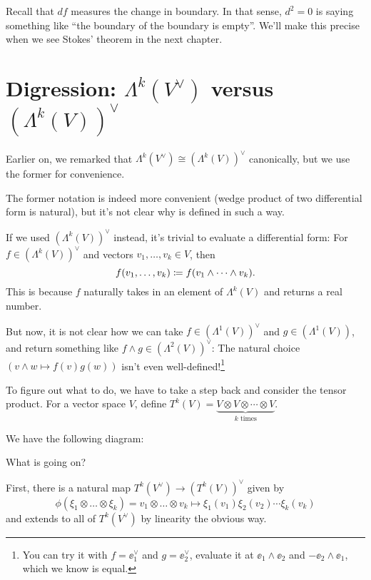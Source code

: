 Recall that $df$ measures the change in boundary.
In that sense, $d^2 = 0$ is saying something like
``the boundary of the boundary is empty''.
We'll make this precise when we see Stokes' theorem in the next chapter.

\section{Digression: $\Lambda^k(V^\vee)$ versus $(\Lambda^k(V))^\vee$}
\label{sec:wedge_product_dual}

Earlier on, we remarked that $\Lambda^k(V^\vee) \cong (\Lambda^k(V))^\vee$ canonically, but we
use the former for convenience.

The former notation is indeed more convenient (wedge product of
two differential form is natural), but it's not clear why  is
defined in such a way.

If we used $(\Lambda^k(V))^\vee$ instead, it's trivial to evaluate a differential form:
For $f \in (\Lambda^k(V))^\vee$ and vectors $v_1, \dots, v_k \in V$, then
\[
	f(v_1, \dots, v_k) \coloneqq f(v_1 \wedge \dots \wedge v_k).
\]
This is because $f$ naturally takes in an element of $\Lambda^k(V)$ and returns a real number.

But now, it is not clear how we can take $f \in (\Lambda^1(V))^\vee$ and $g \in (\Lambda^1(V))$, and
return something like $f \wedge g \in (\Lambda^2(V))^\vee$: The natural choice $(v \wedge w
\mapsto f(v) g(w))$ isn't even well-defined!\footnote{You can try it with $f = \ee_1^\vee$ and
$g = \ee_2^\vee$, evaluate it at $\ee_1 \wedge \ee_2$ and $-\ee_2 \wedge \ee_1$,
which we know is equal.}

To figure out what to do, we have to take a step back and consider the tensor product.
For a vector space $V$,
define $T^k(V) = \underbrace{V \otimes V \otimes \cdots \otimes V}_{\text{$k$ times}}$.

We have the following diagram:
\begin{center}
\end{center}

What is going on?

First, there is a natural map $T^k(V^\vee) \to (T^k(V))^\vee$ given by
\[ \phi(\xi_1 \otimes \dots \otimes \xi_k) = v_1 \otimes \dots \otimes v_k \mapsto
\xi_1(v_1) \xi_2(v_2) \dotsm \xi_k(v_k) \]
and extends to all of $T^k(V^\vee)$ by linearity the obvious way.

